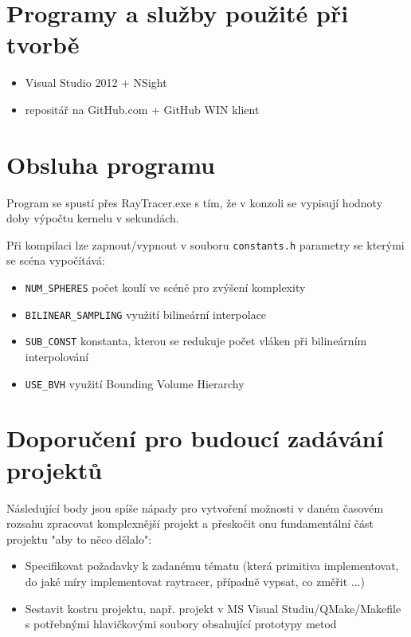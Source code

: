 \documentclass[12pt,a4paper,titlepage,final]{report}
\begin{document}
\section{Programy a služby použité při tvorbě}
\begin{itemize}
	\item Visual Studio 2012 + NSight
	\item repositář na GitHub.com + GitHub WIN klient
\end{itemize}

\section{Obsluha programu}
Program se spustí přes RayTracer.exe s tím, že v konzoli se vypisují hodnoty doby výpočtu kernelu v sekundách.

Při kompilaci lze zapnout/vypnout v souboru \verb|constants.h| parametry se kterými se scéna vypočítává:
\begin{itemize}
	\item \verb|NUM_SPHERES| počet koulí ve scéně pro zvýšení komplexity
	\item \verb|BILINEAR_SAMPLING| využití bilineární interpolace
	\item \verb|SUB_CONST| konstanta, kterou se redukuje počet vláken při bilineárním interpolování
	\item \verb|USE_BVH| využití Bounding Volume Hierarchy
\end{itemize}


\section{Doporučení pro budoucí zadávání projektů}

Následující body jsou spíše nápady pro vytvoření možnosti v daném časovém rozsahu zpracovat komplexnější projekt a přeskočit onu fundamentální část projektu "aby to něco dělalo":
\begin{itemize}
	\item Specifikovat požadavky k zadanému tématu (která primitiva implementovat, do jaké míry implementovat raytracer, případně vypsat, co změřit ...)
	\item Sestavit kostru projektu, např. projekt v MS Visual Studiu/QMake/Makefile s potřebnými hlavičkovými soubory obsahující prototypy metod
\end{itemize}




\nocite{pgr-raytracing}
\nocite{aurelius}
\nocite{pgp-optimalizace}
\nocite{cuda-doc}
\nocite{phong-wiki}
\nocite{so-stack}
\nocite{bvh}
\nocite{cmemory}
\nocite{trier}


\end{document}

